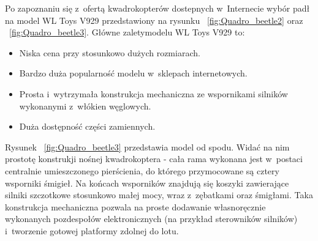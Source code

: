 Po zapoznaniu się z~ofertą kwadrokopterów dostepnych w~Internecie wybór padł na model WL Toys V929 przedstawiony na rysunku ~\ref{fig:Quadro_beetle2} oraz ~\ref{fig:Quadro_beetle3}. Główne zaletymodelu WL Toys V929 to:

\begin{itemize}
	\item Niska cena przy stosunkowo dużych rozmiarach.
	\item Bardzo duża popularność modelu w~sklepach internetowych.
	\item Prosta i~wytrzymała konstrukcja mechaniczna ze wspornikami silników wykonanymi z~włókien węglowych.
	\item Duża dostępność części zamiennych.
\end{itemize}



Rysunek ~\ref{fig:Quadro_beetle3} przedstawia model od spodu. Widać na nim prostotę konstrukji nośnej kwadrokoptera - cała rama wykonana jest w~postaci centralnie umieszczonego pierścienia, do którego przymocowane są cztery wsporniki śmigieł. Na końcach wsporników znajdują się koszyki zawierające silniki szczotkowe stosunkowo małej mocy, wraz z~zębatkami oraz śmigłami. Taka konstrukcja mechaniczna pozwala na proste dodawanie własnoręcznie wykonanych pozdespołów elektronicznych (na przykład sterowników silników) i~tworzenie gotowej platformy zdolnej do lotu. 

